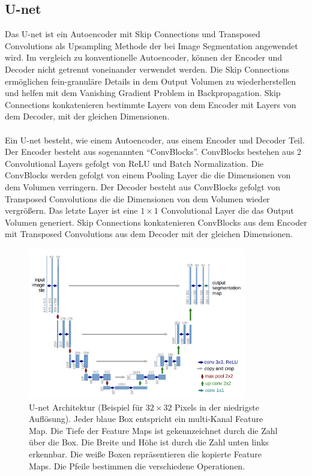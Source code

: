 \subsection{U-net}\label{section:u-net}
Das U-net ist ein Autoencoder mit Skip Connections und Transposed Convolutions als Upsampling Methode der bei Image Segmentation angewendet wird.
Im vergleich zu konventionelle Autoencoder, können der Encoder und Decoder nicht getrennt voneinander verwendet werden. Die Skip Connections
ermöglichen fein-granuläre Details in dem Output Volumen zu wiederherstellen und helfen mit dem Vanishing Gradient Problem in Backpropagation. 
Skip Connections konkatenieren bestimmte Layers von dem Encoder mit Layers von dem Decoder, mit der gleichen Dimensionen.
\\
\\
Ein U-net besteht, wie einem Autoencoder, aus einem Encoder und Decoder Teil. Der Encoder besteht aus sogenannten ``ConvBlocks''. ConvBlocks
bestehen aus 2 Convolutional Layers gefolgt von ReLU und Batch Normalization. Die ConvBlocks werden gefolgt
von einem Pooling Layer die die Dimensionen von dem Volumen verringern. Der Decoder besteht aus ConvBlocks gefolgt von Transposed Convolutions
die die Dimensionen von dem Volumen wieder vergrößern. Das letzte Layer ist eine $1 \times 1$ Convolutional Layer die das Output Volumen generiert.
Skip Connections konkatenieren ConvBlocks aus dem Encoder mit Transposed Convolutions aus dem Decoder mit der gleichen Dimensionen.

\begin{figure}[H]
  \centering
  \includegraphics[width=0.85\textwidth]{resources/networks/unet.png}
  \caption{
    U-net Architektur (Beispiel für $32 \times 32$ Pixels in der niedrigste Auflösung). Jeder blaue Box entspricht ein multi-Kanal Feature Map.
    Die Tiefe der Feature Maps ist gekennzeichnet durch die Zahl über die Box. Die Breite und Höhe ist durch die Zahl unten links erkennbar.
    Die weiße Boxen repräsentieren die kopierte Feature Maps. Die Pfeile bestimmen die verschiedene Operationen.
    \cite{ronneberger2015unet}
  }
  \label{image:unet}
\end{figure}

